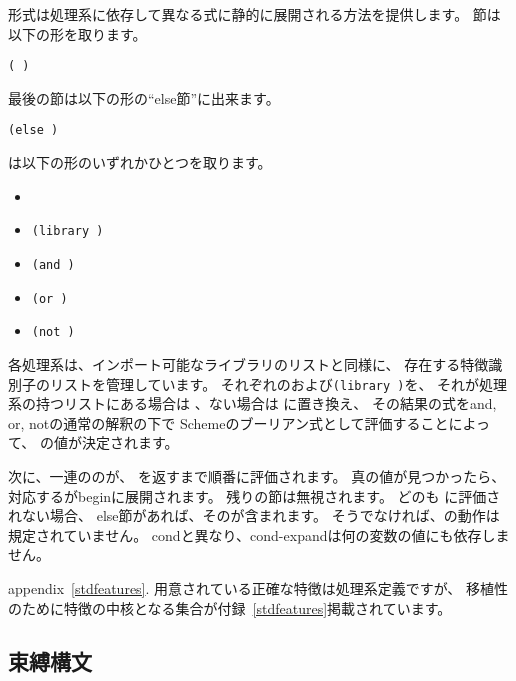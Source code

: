 \begin{entry}{%
}

\syntax
{}形式は処理系に依存して異なる式に静的に展開される方法を提供します。
節は以下の形を取ります。

{\tt(  \dotsfoo)}

最後の節は以下の形の``else節''に出来ます。

{\tt(else  \dotsfoo)}

は以下の形のいずれかひとつを取ります。

\begin{itemize}
\item {\tt{}}
\item {\tt(library )}
\item {\tt(and  \dotsfoo)}
\item {\tt(or  \dotsfoo)}
\item {\tt(not )}
\end{itemize}

\semantics
各処理系は、インポート可能なライブラリのリストと同様に、
存在する特徴識別子のリストを管理しています。
それぞれのおよび{\tt(library )}を、
それが処理系の持つリストにある場合は \schtrue、ない場合は \schfalse に置き換え、
その結果の式を{\cf and}, {\cf or}, {\cf not}の通常の解釈の下で
Schemeのブーリアン式として評価することによって、
の値が決定されます。

次に、一連ののが、
\schtrue を返すまで順番に評価されます。
真の値が見つかったら、対応するが{\cf begin}に展開されます。
残りの節は無視されます。
どのも \schtrue に評価されない場合、
else節があれば、そのが含まれます。
そうでなければ、の動作は規定されていません。
{\cf cond}と異なり、{\cf cond-expand}は何の変数の値にも依存しません。

appendix~\ref{stdfeatures}.
用意されている正確な特徴は処理系定義ですが、
移植性のために特徴の中核となる集合が付録~\ref{stdfeatures}掲載されています。

\end{entry}

\subsection{束縛構文}
\label{bindingsection}

